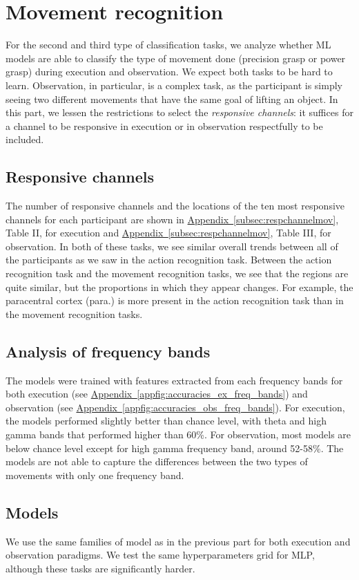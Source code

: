 \documentclass[10pt,conference,compsocconf]{IEEEtran}
\newcommand{\aref}[1]{\hyperref[#1]{Appendix~\ref*{#1}}}
\begin{document}
\section{Movement recognition}
\label{sec:objectrecognition}
For the second and third type of classification tasks, we analyze whether ML models are able to classify the type of movement done (precision grasp or power grasp) during execution and observation. We expect both tasks to be hard to learn. Observation, in particular, is a complex task, as the participant is simply seeing two different movements that have the same goal of lifting an object. In this part, we lessen the restrictions to select the \textit{responsive channels}: it suffices for a channel to be responsive in execution or in observation respectfully to be included.

\subsection{Responsive channels}
The number of responsive channels and the locations of the ten most responsive channels for each participant are shown in \aref{subsec:respchannelmov}, Table II, for execution and \aref{subsec:respchannelmov}, Table III, for observation. In both of these tasks, we see similar overall trends between all of the participants as we saw in the action recognition task. Between the action recognition task and the movement recognition tasks, we see that the regions are quite similar, but the proportions in which they appear changes. For example, the paracentral cortex (para.) \cite{paracentral} is more present in the action recognition task than in the movement recognition tasks.

\subsection{Analysis of frequency bands}
The models were trained with features extracted from each frequency bands for both execution (see \aref{appfig:accuracies_ex_freq_bands}) and observation (see \aref{appfig:accuracies_obs_freq_bands}). For execution, the models performed slightly better than chance level, with theta and high gamma bands that performed higher than 60\%. For observation, most models are below chance level except for high gamma frequency band, around 52-58\%. The models are not able to capture the differences between the two types of movements with only one frequency band.

\subsection{Models}
We use the same families of model as in the previous part for both execution and observation paradigms. We test the same hyperparameters grid for MLP, although these tasks are significantly harder.
\end{document}

